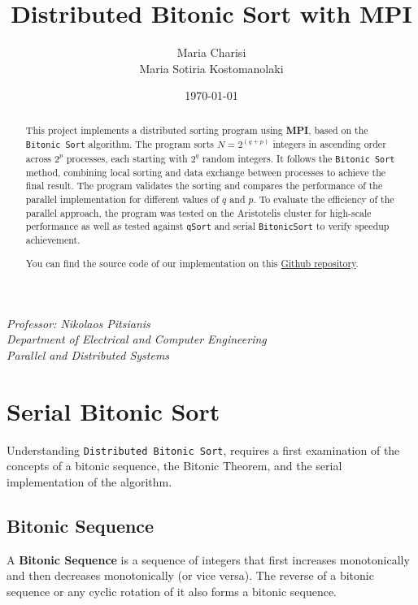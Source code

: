 \documentclass[12pt]{article}
\title{\textbf{Distributed Bitonic Sort with MPI}}
\author{Maria Charisi\\Maria Sotiria Kostomanolaki}
\date{\today}
\begin{document}
\maketitle

\begin{abstract}
    This project implements a distributed sorting program using \textbf{MPI}, based on the \texttt{Bitonic Sort} algorithm. The program sorts \( N = 2^{(q + p)} \) integers in ascending order across \( 2^p \) processes, each starting with \( 2^q \) random integers. It follows the \texttt{Bitonic Sort} method, combining local sorting and data exchange between processes to achieve the final result. The program validates the sorting and compares the performance of the parallel implementation for different values of \( q \) and \( p \). To evaluate the efficiency of the parallel approach, the program was tested on the Aristotelis cluster for high-scale performance as well as tested against \texttt{qSort} and serial \texttt{BitonicSort} to verify speedup achievement.
    
    You can find the source code of our implementation on this \href {https://github.com/mariaxarisi/Bitonic-Sort}{Github repository}.
\end{abstract}

\tableofcontents

\vfill
\begin{center}
    \textit{Professor: Nikolaos Pitsianis\\
    Department of Electrical and Computer Engineering\\
    Parallel and Distributed Systems}
\end{center}
\newpage

\section{Serial Bitonic Sort}

Understanding \texttt{Distributed Bitonic Sort}, requires a first examination of the concepts of a bitonic sequence, the Bitonic Theorem, and the serial implementation of the algorithm.

\subsection{Bitonic Sequence}

\begin{definitionbox}
A \textbf{Bitonic Sequence} is a sequence of integers that first increases monotonically and then decreases monotonically (or vice versa). The reverse of a bitonic sequence or any cyclic rotation of it also forms a bitonic sequence.
\end{definitionbox}
\end{document}

